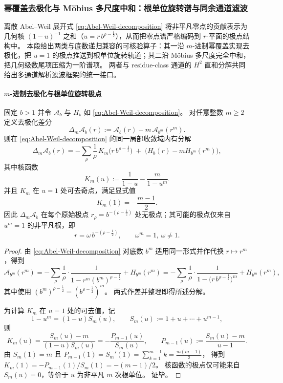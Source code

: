 \subsubsection{幂覆盖去极化与 Möbius 多尺度中和：根单位旋转谱与同余通道滤波}\label{subsubsec:xi-abel-weil-depolarization-mobius-neutralization}
离散 Abel--Weil 展开式 \eqref{eq:Abel-Weil-decomposition} 将非平凡零点的贡献表示为几何核
\(
(1-u)^{-1}
\)
之和（\(u=r\,b^{\rho-\frac12}\)），从而把零点谱严格编码到 \(r\)-平面的极点结构中。
本段给出两类与底数递归兼容的可核验算子：其一沿 \(m\)-进制幂覆盖实现去极化，把 \(u=1\) 的极点推送到根单位旋转轨道；其二沿 Möbius 多尺度完全中和，把几何级数尾项压缩为一阶谱项。
两者与 residue-class 通道的 \(H^2\) 直和分解共同给出多通道解析滤波框架的统一接口。
\par

\paragraph{\texorpdfstring{$m$}{m}-进制去极化与根单位旋转极点}
\begin{theorem}[去极化算子与根单位旋转谱]\label{thm:abel-depolarization-root-unity-rotation}
固定 \(b>1\) 并令 \(\mathcal A_b\) 与 \(H_b\) 如 \eqref{eq:Abel-Weil-decomposition}。
对任意整数 \(m\ge 2\) 定义去极化差分
\[
\boxed{\ \Delta_m\mathcal A_b(r):=\mathcal A_b(r)-m\,\mathcal A_{b^m}(r^m).\ }
\]
则在 \eqref{eq:Abel-Weil-decomposition} 的同一局部收敛域内有分解
\[
\boxed{\ \Delta_m\mathcal A_b(r)
=-\sum_{\rho}\frac{1}{\rho}\,K_m\!\bigl(r\,b^{\rho-\frac12}\bigr)
\;+\;\bigl(H_b(r)-mH_{b^m}(r^m)\bigr),\ }
\]
其中核函数
\[
K_m(u):=\frac{1}{1-u}-\frac{m}{1-u^m}.
\]
并且 \(K_m\) 在 \(u=1\) 处可去奇点，满足显式值
\[
\boxed{\ K_m(1)=-\frac{m-1}{2}.\ }
\]
因此 \(\Delta_m\mathcal A_b\) 在每个原始极点 \(r_\rho=b^{-(\rho-\frac12)}\) 处无极点；其可能的极点仅来自 \(u^m=1\) 的非平凡根，即
\[
r=\omega\,b^{-(\rho-\frac12)},\qquad \omega^m=1,\ \omega\neq 1.
\]
\end{theorem}
\begin{proof}
由 \eqref{eq:Abel-Weil-decomposition} 对底数 \(b^m\) 适用同一形式并作代换 \(r\mapsto r^m\)，得到
\[
\mathcal A_{b^m}(r^m)
=-\sum_{\rho}\frac{1}{\rho}\cdot\frac{1}{1-r^m(b^m)^{\rho-\frac12}}+H_{b^m}(r^m)
=-\sum_{\rho}\frac{1}{\rho}\cdot\frac{1}{1-\bigl(r\,b^{\rho-\frac12}\bigr)^m}+H_{b^m}(r^m),
\]
其中使用 \((b^m)^{\rho-\frac12}=(b^{\rho-\frac12})^m\)。
两式作差并整理即得所述分解。
\par
为计算 \(K_m\) 在 \(u=1\) 处的可去值，记
\[
1-u^m=(1-u)S_m(u),\qquad S_m(u):=1+u+\cdots+u^{m-1},
\]
则
\[
K_m(u)=\frac{S_m(u)-m}{(1-u)S_m(u)}=-\frac{P_{m-1}(u)}{S_m(u)},
\qquad
P_{m-1}(u):=\frac{S_m(u)-m}{u-1}.
\]
由 \(S_m(1)=m\) 且
\(
P_{m-1}(1)=S_m'(1)=\sum_{k=1}^{m-1}k=\frac{m(m-1)}{2}
\)，
得到
\(
K_m(1)=-P_{m-1}(1)/S_m(1)=-(m-1)/2
\)。
核函数的极点仅可能来自 \(S_m(u)=0\)，等价于 \(u\) 为非平凡 \(m\) 次根单位。
证毕。
\end{proof}

